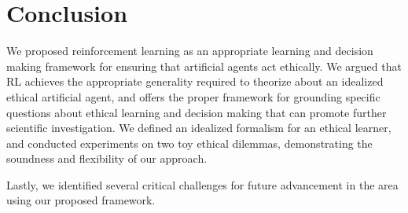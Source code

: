 \documentclass[11pt]{article}
\begin{document}

\section{Conclusion}

We proposed reinforcement learning as an appropriate learning and decision making framework for ensuring that artificial agents act ethically. We argued that RL achieves the appropriate generality required to theorize about an idealized ethical artificial agent, and offers the proper framework for grounding specific questions about ethical learning and decision making that can promote further scientific investigation. We defined an idealized formalism for an ethical learner, and conducted experiments on two toy ethical dilemmas, demonstrating the soundness and flexibility of our approach.

Lastly, we identified several critical challenges for future advancement in the area using our proposed framework.



\end{document}
